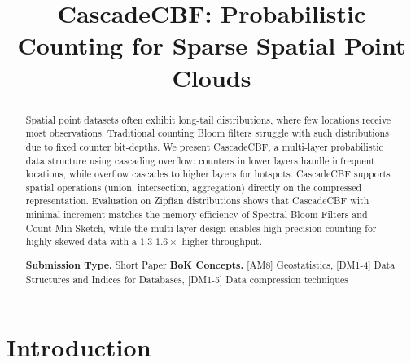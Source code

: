 \documentclass[agile, final]{copernicus-agile}
\begin{document}
\title{CascadeCBF: Probabilistic Counting for Sparse Spatial Point Clouds}





\maketitle

\begin{abstract}
Spatial point datasets often exhibit long-tail distributions, where few locations receive most observations. Traditional counting Bloom filters struggle with such distributions due to fixed counter bit-depths. We present CascadeCBF, a multi-layer probabilistic data structure using cascading overflow: counters in lower layers handle infrequent locations, while overflow cascades to higher layers for hotspots. CascadeCBF supports spatial operations (union, intersection, aggregation) directly on the compressed representation. Evaluation on Zipfian distributions shows that CascadeCBF with minimal increment matches the memory efficiency of Spectral Bloom Filters and Count-Min Sketch, while the multi-layer design enables high-precision counting for highly skewed data with a $1.3$-$1.6 \times$ higher throughput.

\textbf{Submission Type.} Short Paper \quad \textbf{BoK Concepts.} [AM8] Geostatistics, [DM1-4] Data Structures and Indices for Databases, [DM1-5] Data compression techniques


\end{abstract}

\section{Introduction}
\label{sec:intro}
\end{document}
